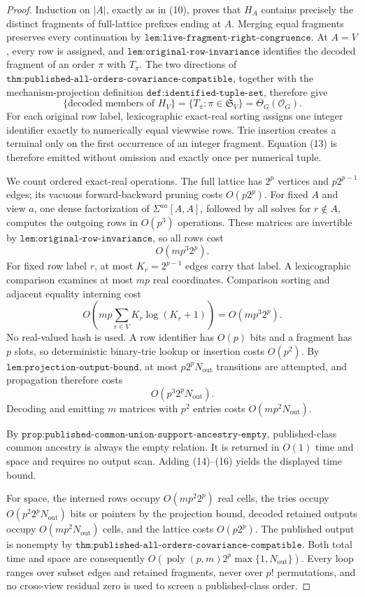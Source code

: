 \documentclass{article}
\begin{document}
\begin{proof}
Induction on \(|A|\), exactly as in (10), proves that \(H_A\) contains precisely the distinct fragments of full-lattice prefixes ending at \(A\).  Merging equal fragments preserves every continuation by \(\texttt{lem:live-fragment-right-congruence}\).  At \(A=V\), every row is assigned, and \(\texttt{lem:original-row-invariance}\) identifies the decoded fragment of an order \(\pi\) with \(T_\pi\).  The two directions of \(\texttt{thm:published-all-orders-covariance-compatible}\), together with the mechanism-projection definition \(\texttt{def:identified-tuple-set}\), therefore give
\[
 \{\text{decoded members of }H_V\}
 =\{T_\pi:\pi\in\mathfrak S_V\}
 =\Theta_G(\mathcal O_G).
 \tag{13}
\]
For each original row label, lexicographic exact-real sorting assigns one integer identifier exactly to numerically equal viewwise rows.  Trie insertion creates a terminal only on the first occurrence of an integer fragment.  Equation (13) is therefore emitted without omission and exactly once per numerical tuple.

We count ordered exact-real operations.  The full lattice has \(2^p\) vertices and \(p2^{p-1}\) edges; its vacuous forward-backward pruning costs \(O(p2^p)\).  For fixed \(A\) and view \(a\), one dense factorization of \(\Sigma^{aa}[A,A]\), followed by all solves for \(r\notin A\), computes the outgoing rows in \(O(p^3)\) operations.  These matrices are invertible by \(\texttt{lem:original-row-invariance}\), so all rows cost
\[
 O(mp^3 2^p).
 \tag{14}
\]
For fixed row label \(r\), at most \(K_r=2^{p-1}\) edges carry that label.  A lexicographic comparison examines at most \(mp\) real coordinates.  Comparison sorting and adjacent equality interning cost
\[
 O\!\left(mp\sum_{r\in V}K_r\log(K_r+1)\right)
 =O(mp^3 2^p).
 \tag{15}
\]
No real-valued hash is used.  A row identifier has \(O(p)\) bits and a fragment has \(p\) slots, so deterministic binary-trie lookup or insertion costs \(O(p^2)\).  By \(\texttt{lem:projection-output-bound}\), at most \(p2^pN_{\mathrm{out}}\) transitions are attempted, and propagation therefore costs
\[
 O(p^3 2^pN_{\mathrm{out}}).
 \tag{16}
\]
Decoding and emitting \(m\) matrices with \(p^2\) entries costs \(O(mp^2N_{\mathrm{out}})\).

By \(\texttt{prop:published-common-union-support-ancestry-empty}\), published-class common ancestry is always the empty relation.  It is returned in \(O(1)\) time and space and requires no output scan.  Adding (14)--(16) yields the displayed time bound.

For space, the interned rows occupy \(O(mp^2 2^p)\) real cells, the tries occupy \(O(p^2 2^pN_{\mathrm{out}})\) bits or pointers by the projection bound, decoded retained outputs occupy \(O(mp^2N_{\mathrm{out}})\) cells, and the lattice costs \(O(p2^p)\).  The published output is nonempty by \(\texttt{thm:published-all-orders-covariance-compatible}\).  Both total time and space are consequently \(O(\operatorname{poly}(p,m)2^p\max\{1,N_{\mathrm{out}}\})\).  Every loop ranges over subset edges and retained fragments, never over \(p!\) permutations, and no cross-view residual zero is used to screen a published-class order.
\end{proof}
\end{document}

